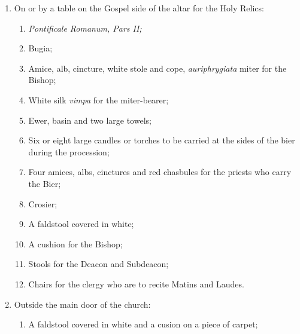 \documentclass[letterpaper]{report}
\begin{document}
{\begin{enumerate}[label=\Roman*.]
        \item On or by a table on the Gospel side of the altar for the Holy
            Relics:

            \begin{enumerate}[label=\arabic*.]

                \item \textit{Pontificale Romanum, Pars II;}

                \item Bugia;

                \item Amice, alb, cincture, white stole and cope,
                    \textit{auriphrygiata} miter for the Bishop;

                \item White silk \textit{vimpa} for the miter-bearer;

                \item Ewer, basin and two large towels;

                \item Six or eight large candles or torches to be carried at
                    the sides of the bier during the procession;

                \item Four amices, albs, cinctures and red chasbules for the
                    priests who carry the Bier;

                \item Crosier;

                \item A faldstool covered in white;

                \item A cushion for the Bishop;

                \item Stools for the Deacon and Subdeacon;

                \item Chairs for the clergy who are to recite Matins and
                    Laudes.

            \end{enumerate}

        \item Outside the main door of the church:

            \begin{enumerate}[label=\arabic*.]
                
                \item A faldstool covered in white and a cusion on a piece of
                    carpet;


\end{enumerate}
\end{enumerate}}
\end{document}

